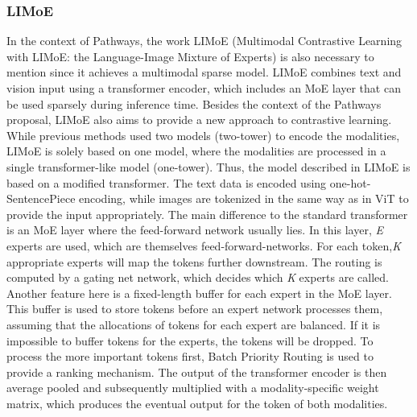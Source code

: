 \documentclass[
]{krantz}
\begin{document}
\hypertarget{limoe}{%
\subsubsection{LIMoE}\label{limoe}}

In the context of Pathways, the work LIMoE (Multimodal Contrastive Learning with LIMoE: the Language-Image Mixture of Experts) \citep{Mustafa2022} is also necessary to mention since it achieves a multimodal sparse model. LIMoE combines text and vision input using a transformer encoder, which includes an MoE layer that can be used sparsely during inference time. Besides the context of the Pathways
proposal, LIMoE also aims to provide a new approach to contrastive learning.
While previous methods used two models (two-tower) to encode the modalities, LIMoE is solely based on one model, where the modalities are processed in a single transformer-like model (one-tower). Thus, the model described in LIMoE is based on a modified transformer. The text data is encoded using one-hot-SentencePiece\citep{kudo-richardson-2018-sentencepiece} encoding, while images are tokenized in the same way as in ViT \citep{dosovitskiy2020image} to provide the input appropriately. The main difference to the standard transformer is an MoE layer where the feed-forward network usually lies. In this layer, \emph{E} experts are used, which are themselves feed-forward-networks. For each token,\emph{K} appropriate experts will map the tokens further downstream. The routing is computed by a gating net network, which decides which \emph{K} experts are called. Another feature here is a fixed-length buffer for each expert in the MoE layer. This buffer is used to store tokens before an expert network processes them, assuming that the allocations of tokens for each expert are balanced. If it is impossible to buffer tokens for the experts, the tokens will be dropped. To process the more important tokens first, Batch Priority Routing \citep{Riquelme2021} is used to provide a ranking mechanism. The output of the transformer encoder is then average pooled and subsequently multiplied with a modality-specific weight matrix, which produces the eventual output
for the token of both modalities.
\end{document}
